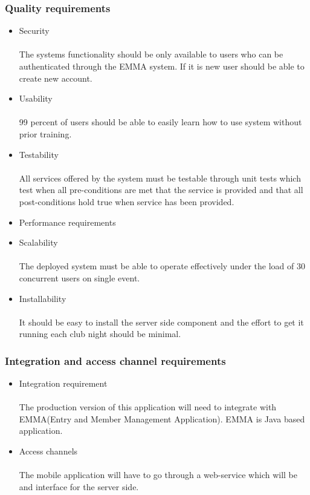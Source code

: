 \documentclass[10pt,a4paper]{article}
\begin{document}
\subsubsection{Quality requirements}
\begin{itemize}
\item Security
\paragraph{}
The systems functionality should be only available to users who can be authenticated through the EMMA system. If it is new user should be able to create new account.
\item Usability
\paragraph{}
99 percent of users should be able to easily learn how to use system without prior training.
\item Testability
\paragraph{}
All services offered by the system must be testable through unit tests which test when all pre-conditions are met that the service is provided and that all post-conditions hold true when service has been provided.
\item Performance requirements
\item Scalability
\paragraph{}
The deployed system must be able to operate effectively under the load of 30 concurrent users on single event.
\item Installability
\paragraph{}
It should be easy to install the server side component and the effort to get it running each club night should be minimal.
\end{itemize}
\subsubsection{Integration and access channel requirements}
\begin{itemize}
\item Integration requirement
\paragraph{}
The production version of this application will need to integrate with EMMA(Entry and Member Management Application). EMMA is Java based application.
\item Access channels
\paragraph{}
The mobile application will have to go through a web-service which will be and interface for the server side. 
\end{itemize}
\end{document}
